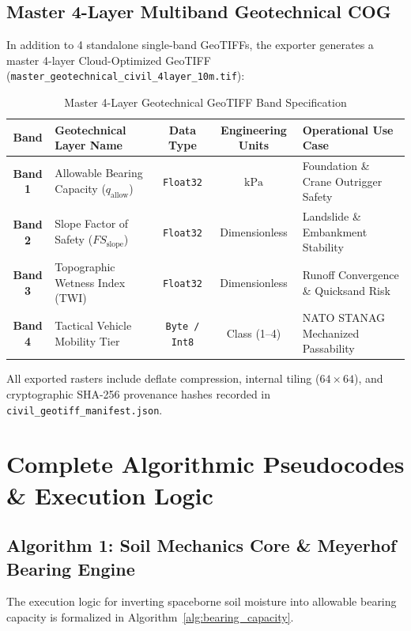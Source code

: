 \documentclass[11pt,a4paper]{article}
\theoremstyle{definition}
\theoremstyle{remark}
\begin{document}
\subsection{Master 4-Layer Multiband Geotechnical COG}
In addition to 4 standalone single-band GeoTIFFs, the exporter generates a master 4-layer Cloud-Optimized GeoTIFF (\texttt{master\_geotechnical\_civil\_4layer\_10m.tif}):
\begin{table}[htbp]
\centering
\small
\caption{Master 4-Layer Geotechnical GeoTIFF Band Specification}
\begin{tabular}{clccl}
\toprule
\textbf{Band} & \textbf{Geotechnical Layer Name} & \textbf{Data Type} & \textbf{Engineering Units} & \textbf{Operational Use Case} \\
\midrule
\textbf{Band 1} & Allowable Bearing Capacity ($q_{\text{allow}}$) & \texttt{Float32} & $\text{kPa}$ & Foundation \& Crane Outrigger Safety \\
\textbf{Band 2} & Slope Factor of Safety ($FS_{\text{slope}}$) & \texttt{Float32} & Dimensionless & Landslide \& Embankment Stability \\
\textbf{Band 3} & Topographic Wetness Index (TWI) & \texttt{Float32} & Dimensionless & Runoff Convergence \& Quicksand Risk \\
\textbf{Band 4} & Tactical Vehicle Mobility Tier & \texttt{Byte / Int8} & Class (1--4) & NATO STANAG Mechanized Passability \\
\bottomrule
\end{tabular}
\label{tab:master_geotiff_bands}
\end{table}

All exported rasters include deflate compression, internal tiling ($64 \times 64$), and cryptographic SHA-256 provenance hashes recorded in \texttt{civil\_geotiff\_manifest.json}.


\section{Complete Algorithmic Pseudocodes \& Execution Logic}

\subsection{Algorithm 1: Soil Mechanics Core & Meyerhof Bearing Engine}
The execution logic for inverting spaceborne soil moisture into allowable bearing capacity is formalized in Algorithm~\ref{alg:bearing_capacity}.
\end{document}
